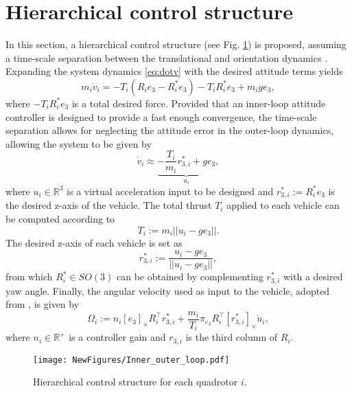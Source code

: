 \section{Hierarchical control structure} \label{sec:controlstrategy}
In this section, a hierarchical control structure (see Fig. \ref{fig:controllayout}) is proposed, assuming a time-scale separation between the translational and orientation dynamics \cite{Bertrand2011,herisse12}. Expanding the system dynamics \eqref{eq:dotv} with the desired attitude terms yields
\begin{equation}
	m_i\dot{v}_i = -T_i (R_ie_3- R_i^* e_3) - T_i R_i^* e_3 + m_i g e_3,
\end{equation}
where $-T_iR_i^* e_3$ is a total desired force. Provided that an inner-loop attitude controller is designed to provide a fast enough convergence, the time-scale separation allows for neglecting the attitude error in the outer-loop dynamics, allowing the system to be given by  
\begin{equation}
	\dot{v}_i \approx \underbrace{- \frac{T_i}{m_i} r_{3,i}^* + g e_3}_{u_i},
	\label{eqn:double_integrator_model}
\end{equation}
where $u_i \in \mathbb{R}^3$ is a virtual acceleration input to be designed and $r_{3,i}^*:=R_i^* e_3$ is the desired z-axis of the vehicle. The total thrust $T_i$ applied to each vehicle can be computed according to
\begin{equation}
	T_i := m_i||u_i - g e_3||.
\end{equation}
The desired z-axis of each vehicle is set as
\begin{equation}
	r_{3,i}^* := \frac{u_i - g e_3}{||u_i - g e_3||},
\end{equation}
from which $R_i^*\in SO(3)$ can be obtained by complementing $r_{3,i}^*$ with a desired yaw angle. Finally, the angular velocity used as input to the vehicle, adopted from \cite{Tang2015}, is given by
\begin{equation}\label{eq:Omega}
	\Omega_i := n_i [e_3]_{\times} R_i^\top r_{3,i}^* + \frac{m_i}{T_i} \pi_{e_3} R_i^\top [r_{3,i}^*]_{\times}\dot{u}_i,
\end{equation}
where $n_i \in \mathbb{R}^{+}$ is a controller gain and $ r_{3,i}$ is the third column of $R_i$. 
\begin{figure}%
	\centering
	\texttt{[image: NewFigures/Inner\_outer\_loop.pdf]}
    \vspace{-0.4cm}
	\caption{Hierarchical control structure for each quadrotor $i$.}
	\label{fig:controllayout}
\end{figure}

